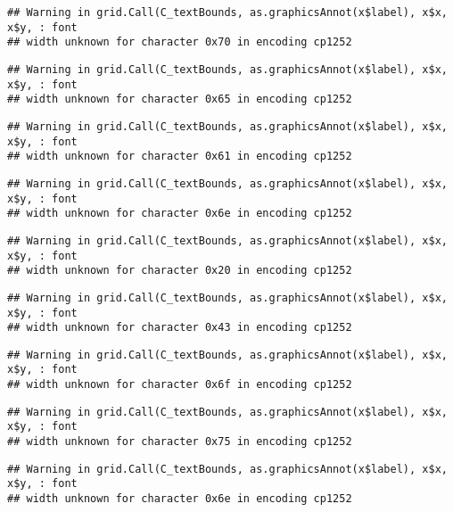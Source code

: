 \documentclass[
]{article}
\begin{document}
\begin{verbatim}
## Warning in grid.Call(C_textBounds, as.graphicsAnnot(x$label), x$x, x$y, : font
## width unknown for character 0x70 in encoding cp1252
\end{verbatim}

\begin{verbatim}
## Warning in grid.Call(C_textBounds, as.graphicsAnnot(x$label), x$x, x$y, : font
## width unknown for character 0x65 in encoding cp1252
\end{verbatim}

\begin{verbatim}
## Warning in grid.Call(C_textBounds, as.graphicsAnnot(x$label), x$x, x$y, : font
## width unknown for character 0x61 in encoding cp1252
\end{verbatim}

\begin{verbatim}
## Warning in grid.Call(C_textBounds, as.graphicsAnnot(x$label), x$x, x$y, : font
## width unknown for character 0x6e in encoding cp1252
\end{verbatim}

\begin{verbatim}
## Warning in grid.Call(C_textBounds, as.graphicsAnnot(x$label), x$x, x$y, : font
## width unknown for character 0x20 in encoding cp1252
\end{verbatim}

\begin{verbatim}
## Warning in grid.Call(C_textBounds, as.graphicsAnnot(x$label), x$x, x$y, : font
## width unknown for character 0x43 in encoding cp1252
\end{verbatim}

\begin{verbatim}
## Warning in grid.Call(C_textBounds, as.graphicsAnnot(x$label), x$x, x$y, : font
## width unknown for character 0x6f in encoding cp1252
\end{verbatim}

\begin{verbatim}
## Warning in grid.Call(C_textBounds, as.graphicsAnnot(x$label), x$x, x$y, : font
## width unknown for character 0x75 in encoding cp1252
\end{verbatim}

\begin{verbatim}
## Warning in grid.Call(C_textBounds, as.graphicsAnnot(x$label), x$x, x$y, : font
## width unknown for character 0x6e in encoding cp1252
\end{verbatim}
\end{document}
